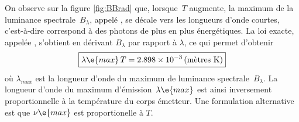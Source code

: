 \sk
On observe sur la figure \ref{fig:BBrad} que, lorsque~$T$ augmente, la maximum de la luminance spectrale~$B_\lambda$, appelé , se décale vers les longueurs d'onde courtes, c'est-à-dire correspond à des photons de plus en plus énergétiques. La loi exacte, appelée , s'obtient en dérivant $B_\lambda$ par rapport à $\lambda$, ce qui permet d'obtenir $$ \boxed{ \lambda\e{max} \, T = 2.898 \times 10^{-3} \, \textrm{(mètres~K)} } $$ où $\lambda_{max}$ est la longueur d'onde du maximum de luminance spectrale~$B_\lambda$. La longueur d'onde du maximum d'émission~$\lambda\e{max}$ est ainsi inversement proportionnelle à la température du corps émetteur. Une formulation alternative est que $\nu\e{max}$ est proportionelle à $T$.
